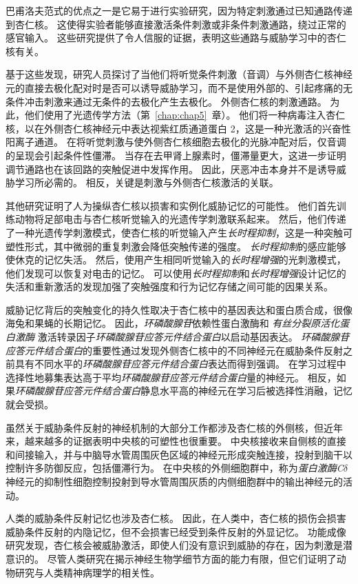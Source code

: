 巴甫洛夫范式的优点之一是它易于进行实验研究，因为特定刺激通过已知通路传递到杏仁核。
这使得实验者能够直接激活条件刺激或非条件刺激通路，绕过正常的感官输入。
这些研究提供了令人信服的证据，表明这些通路与威胁学习中的杏仁核有关。


基于这些发现，研究人员探讨了当他们将听觉条件刺激（音调）与外侧杏仁核神经元的直接去极化配对时是否可以诱导威胁学习，而不是使用外部的、引起疼痛的无条件冲击刺激来通过无条件的去极化产生去极化。
外侧杏仁核的刺激通路。 为此，他们使用了光遗传学方法（第~\ref{chap:chap5}~章）。
他们将一种病毒注入杏仁核，以在外侧杏仁核神经元中表达视紫红质通道蛋白 2，这是一种光激活的兴奋性阳离子通道。
在将听觉刺激与使外侧杏仁核细胞去极化的光脉冲配对后，仅音调的呈现会引起条件性僵滞。
当存在去甲肾上腺素时，僵滞量更大，这进一步证明调节通路也在该回路的突触促进中发挥作用。
因此，厌恶冲击本身并不是诱导威胁学习所必需的。
相反，关键是刺激与外侧杏仁核激活的关联。


其他研究证明了人为操纵杏仁核以损害和实例化威胁记忆的可能性。
他们首先训练动物将足部电击与杏仁核听觉输入的光遗传学刺激联系起来。
然后，他们传递了一种光遗传学刺激模式，使杏仁核的听觉输入产生\textit{长时程抑制}，这是一种突触可塑性形式，其中微弱的重复刺激会降低突触传递的强度。
\textit{长时程抑制}的感应能够使休克的记忆失活。
然后，使用产生相同听觉输入的\textit{长时程增强}的光刺激模式，他们发现可以恢复对电击的记忆。
可以使用\textit{长时程抑制}和\textit{长时程增强}设计记忆的失活和重新激活的发现加强了突触强度和行为记忆存储之间可能的因果关系。


威胁记忆背后的突触变化的持久性取决于杏仁核中的基因表达和蛋白质合成，很像海兔和果蝇的长期记忆。
因此，\textit{环磷酸腺苷}依赖性蛋白激酶和 \textit{有丝分裂原活化蛋白激酶} 激活转录因子\textit{环磷酸腺苷应答元件结合蛋白}以启动基因表达。
\textit{环磷酸腺苷应答元件结合蛋白}的重要性通过发现外侧杏仁核中的不同神经元在威胁条件反射之前具有不同水平的\textit{环磷酸腺苷应答元件结合蛋白}表达而得到强调。
在学习过程中选择性地募集表达高于平均\textit{环磷酸腺苷应答元件结合蛋白}量的神经元。
相反，如果\textit{环磷酸腺苷应答元件结合蛋白}静息水平高的神经元在学习后被选择性消融，记忆就会受损。


虽然关于威胁条件反射的神经机制的大部分工作都涉及杏仁核的外侧核，但近年来，越来越多的证据表明中央核的可塑性也很重要。
中央核接收来自侧核的直接和间接输入，并与中脑导水管周围灰色区域的神经元形成突触连接，投射到脑干以控制许多防御反应，包括僵滞行为。
在中央核的外侧细胞群中，称为\textit{蛋白激酶C}$ \delta $ 神经元的抑制性细胞控制投射到导水管周围灰质的内侧细胞群中的输出神经元的活动。


人类的威胁条件反射记忆也涉及杏仁核。
因此，在人类中，杏仁核的损伤会损害威胁条件反射的内隐记忆，但不会损害已经受到条件反射的外显记忆。
功能成像研究发现，杏仁核会被威胁激活，即使人们没有意识到威胁的存在，因为刺激是潜意识的。
尽管人类研究在揭示神经生物学细节方面的能力有限，但它们证明了动物研究与人类精神病理学的相关性。


